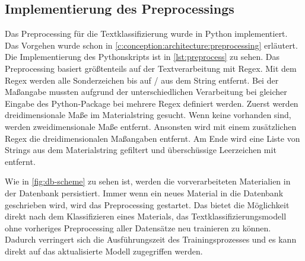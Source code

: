 \subsection{Implementierung des Preprocessings}
\label{c:implementation:preprocess}
Das Preprocessing für die Textklassifizierung wurde in Python implementiert.
Das Vorgehen wurde schon in \autoref{c:conception:architecture:preprocessing} erläutert. Die Implementierung des Pythonskripts ist in \autoref{lst:preprocess} zu sehen. Das Preprocessing basiert größtenteils auf der Textverarbeitung mit Regex. Mit dem Regex \code{[A-Za-z0-9üäöÜÄÖßóåéèÉÈÓ/]} werden alle Sonderzeichen bis auf  \glqq /\grqq{} aus dem String entfernt. Bei der Maßangabe mussten aufgrund der unterschiedlichen Verarbeitung bei gleicher Eingabe des Python-Package  bei   mehrere Regex definiert werden. Zuerst werden dreidimensionale Maße im Materialstring gesucht. Wenn keine vorhanden sind, werden zweidimensionale Maße entfernt. Ansonsten wird mit einem zusätzlichen Regex die dreidimensionalen Maßangaben entfernt. Am Ende wird eine Liste von Strings aus dem Materialstring gefiltert und überschüssige Leerzeichen mit  entfernt. 

Wie in \autoref{fig:db-scheme} zu sehen ist, werden die vorverarbeiteten Materialien in der Datenbank persistiert. Immer wenn ein neues Material in die Datenbank geschrieben wird, wird das Preprocessing gestartet. Das bietet die Möglichkeit direkt nach dem Klassifizieren eines Materials, das Textklassifizierungsmodell ohne vorheriges Preprocessing aller Datensätze neu trainieren zu können. Dadurch verringert sich die Ausführungszeit des Trainingsprozesses und es kann direkt auf das aktualisierte Modell zugegriffen werden.

